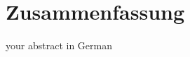 \thispagestyle{empty}
\vspace{-3cm}
\section*{\centering Zusammenfassung}

your abstract in German
\noindent


